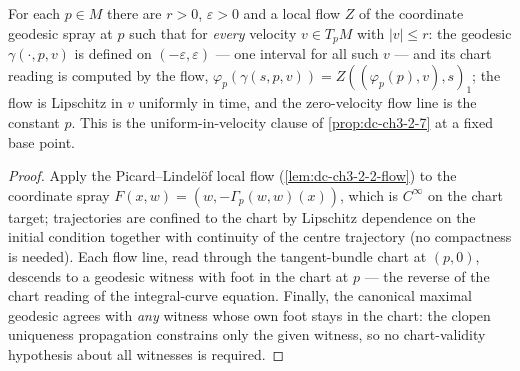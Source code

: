 \begin{lemma}
  \label{lem:dc-ch3-2-7-vuniform}
  \leanok
  For each $p \in M$ there are $r > 0$, $\varepsilon > 0$ and a local flow $Z$
  of the coordinate geodesic spray at $p$ such that for \emph{every} velocity
  $v \in T_pM$ with $|v| \le r$: the geodesic $\gamma(\cdot, p, v)$ is defined
  on $(-\varepsilon, \varepsilon)$ — one interval for all such $v$ — and its
  chart reading is computed by the flow,
  $\varphi_p(\gamma(s, p, v)) = Z((\varphi_p(p), v), s)_1$; the flow is
  Lipschitz in $v$ uniformly in time, and the zero-velocity flow line is the
  constant $p$. This is the uniform-in-velocity clause of
  \cref{prop:dc-ch3-2-7} at a fixed base point.
\end{lemma}
\begin{proof}
  \sketch
  \leanok
  Apply the Picard--Lindelöf local flow (\cref{lem:dc-ch3-2-2-flow}) to the
  coordinate spray $F(x, w) = (w, -\Gamma_p(w, w)(x))$, which is $C^\infty$ on
  the chart target; trajectories are confined to the chart by Lipschitz
  dependence on the initial condition together with continuity of the centre
  trajectory (no compactness is needed). Each flow line, read through the
  tangent-bundle chart at $(p, 0)$, descends to a geodesic witness with foot in
  the chart at $p$ — the reverse of the chart reading of the integral-curve
  equation. Finally, the canonical maximal geodesic agrees with \emph{any}
  witness whose own foot stays in the chart: the clopen uniqueness propagation
  constrains only the given witness, so no chart-validity hypothesis about all
  witnesses is required.
\end{proof}

